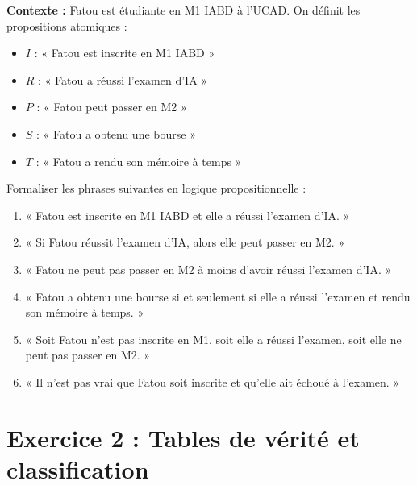 \documentclass[11pt,a4paper]{article}
\begin{document}
\begin{exercice}
\textbf{Contexte :} Fatou est étudiante en M1 IABD à l'UCAD. On définit les propositions atomiques :
\begin{itemize}
    \item $I$ : « Fatou est inscrite en M1 IABD »
    \item $R$ : « Fatou a réussi l'examen d'IA »
    \item $P$ : « Fatou peut passer en M2 »
    \item $S$ : « Fatou a obtenu une bourse »
    \item $T$ : « Fatou a rendu son mémoire à temps »
\end{itemize}

Formaliser les phrases suivantes en logique propositionnelle :

\begin{enumerate}
    \item « Fatou est inscrite en M1 IABD et elle a réussi l'examen d'IA. »
    \item « Si Fatou réussit l'examen d'IA, alors elle peut passer en M2. »
    \item « Fatou ne peut pas passer en M2 à moins d'avoir réussi l'examen d'IA. »
    \item « Fatou a obtenu une bourse si et seulement si elle a réussi l'examen et rendu son mémoire à temps. »
    \item « Soit Fatou n'est pas inscrite en M1, soit elle a réussi l'examen, soit elle ne peut pas passer en M2. »
    \item « Il n'est pas vrai que Fatou soit inscrite et qu'elle ait échoué à l'examen. »
\end{enumerate}
\end{exercice}

\section*{Exercice 2 : Tables de vérité et classification}
\end{document}
